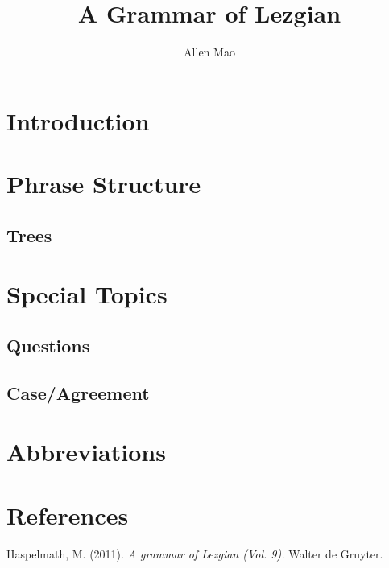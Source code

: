 \documentclass[12pt, letterpaper]{article}
\title{A Grammar of Lezgian}
\author{Allen Mao}
\begin{document}
\maketitle
\section{Introduction}

\section{Phrase Structure}

\subsection{Trees}
\label{subsec:trees}

\section{Special Topics}
\label{sec:spec-topics}
\subsection{Questions}

\subsection{Case/Agreement}

\section{Abbreviations}
\printglossaries
\section{References}
\begin{thebibliography}{}
Haspelmath, M. (2011). \textit{A grammar of Lezgian (Vol. 9).} Walter de Gruyter.

\end{thebibliography}
\end{document}
